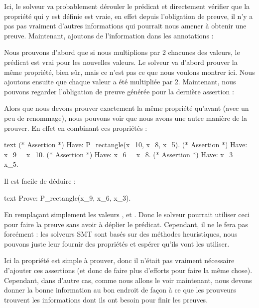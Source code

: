 





Ici, le solveur va probablement dérouler le prédicat et directement vérifier
que la propriété qui y est définie est vraie, en effet depuis l'obligation de
preuve, il n'y a pas pas vraiment d'autres informations qui pourrait nous
amener à obtenir une preuve. Maintenant, ajoutons de l'information dans les
annotations :






Nous prouvons d'abord que si nous multiplions par 2 chacunes des valeurs, le
prédicat est vrai pour les nouvelles valeurs. Le solveur va d'abord prouver
la même propriété, bien sûr, mais ce n'est pas ce que nous voulons montrer ici.
Nous ajoutons ensuite que chaque valeur a été multipliée par 2. Maintenant, nous
pouvons regarder l'obligation de preuve générée pour la dernière assertion :





Alors que nous devons prouver exactement la même propriété qu'avant (avec un peu
de renommage), nous pouvons voir que nous avons une autre manière de la prouver.
En effet en combinant ces propriétés :


\begin{CodeBlock}{text}
(* Assertion *)
Have: P_rectangle(x_10, x_8, x_5).
(* Assertion *)
Have: x_9 = x_10.
(* Assertion *)
Have: x_6 = x_8.
(* Assertion *)
Have: x_3 = x_5.
\end{CodeBlock}


Il est facile de déduire :


\begin{CodeBlock}{text}
Prove: P_rectangle(x_9, x_6, x_3).
\end{CodeBlock}


En remplaçant simplement les valeurs ,  et
. Donc le solveur pourrait utiliser ceci pour faire la preuve
sans avoir à déplier le prédicat. Cependant, il ne le fera pas forcément : les
solveurs SMT sont basés sur des méthodes heuristiques, nous pouvons juste leur
fournir des propriétés et espérer qu'ils vont les utiliser.


Ici la propriété est simple à prouver, donc il n'était pas vraiment nécessaire
d'ajouter ces assertions (et donc de faire plus d'efforts pour faire la même
chose). Cependant, dans d'autre cas, comme nous allons le voir maintenant, nous
devons donner la bonne information au bon endroit de façon à ce que les prouveurs
trouvent les informations dont ils ont besoin pour finir les preuves.


